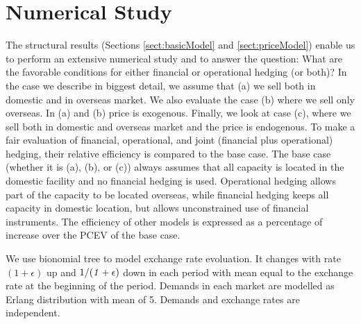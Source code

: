 \documentclass[mnsc,nonblindrev,copyedit]{informs2_wz} %
\begin{document}
\section{Numerical Study \label{sect:numer}}

The structural results (Sections \ref{sect:basicModel} and \ref{sect:priceModel}) enable us to perform an extensive numerical study and to answer the question: What are the favorable conditions for either financial or operational hedging (or both)?  In the case we describe in biggest detail, we assume that (a) we sell both in domestic and in overseas market.  We also evaluate the case (b) where we sell only overseas.  In (a) and (b) price is exogenous.  Finally, we look at case (c), where we sell both in domestic and overseas market and the price is endogenous.  To make a fair evaluation of financial, operational, and joint (financial plus operational) hedging, their relative efficiency is compared to the base case.  The base case (whether it is (a), (b), or (c)) always assumes that all capacity is located in the domestic facility and no financial hedging is used.  Operational hedging allows part of the capacity to be located overseas, while financial hedging keeps all capacity in domestic location, but allows unconstrained use of financial instruments.  The efficiency of other models is expressed as a percentage of increase over the PCEV of the base case.  

We use bionomial tree to model exchange rate evoluation.  It changes with rate {\it $(1+\epsilon)$} up and $1/{\it (1+\epsilon)}$ down in each period with mean equal to the exchange rate at the beginning of the period.  Demands in each market are modelled as Erlang distribution with mean of 5.  Demands and exchange rates are independent. 
\end{document}
